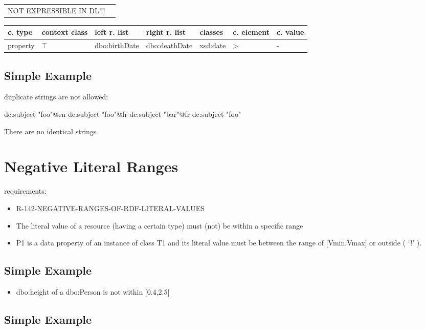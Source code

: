\documentclass{llncs}
\newenvironment{gcotable}{
  \scriptsize
  \sffamily
  \vspace{0.3cm}
	\begin{center}
  \begin{tabular}{l|l|l|l|l|l|l}
  \hline
  \textbf{c. type} & \textbf{context class} & \textbf{left r. list} & \textbf{right r. list} & \textbf{classes} & \textbf{c. element} & \textbf{c. value} \\
  \hline

}{
  \hline
  \end{tabular}
	\end{center}
}
\newenvironment{DL}{
	\begin{center}
  \begin{tabular}{r l}

}{
  \end{tabular}
	\end{center}
}
\begin{document}
\begin{DL}
NOT EXPRESSIBLE IN DL!!!
\end{DL}

\begin{gcotable}
property & $\top$ & dbo:birthDate & dbo:deathDate & xsd:date & \textgreater & - \\
\end{gcotable}

\subsection{Simple Example}

duplicate strings are not allowed:

\begin{ex}
dc:subject "foo"@en
dc:subject "foo"@fr
dc:subject "bar"@fr
dc:subject "foo"
\end{ex}

There are no identical strings.

\section{Negative Literal Ranges}

requirements:

\begin{itemize}
	\item R-142-NEGATIVE-RANGES-OF-RDF-LITERAL-VALUES
\end{itemize}



\begin{itemize}
	\item The literal value of a resource (having a certain type) must (not) be within a specific range
  \item P1 is a data property of an instance of class T1 and its literal value must be between the range of [Vmin,Vmax] or outside ( ‘!' ).
\end{itemize}

\subsection{Simple Example}

\begin{itemize}
	\item dbo:height of a dbo:Person is not within [0.4,2.5]
\end{itemize}

\subsection{Simple Example}
\end{document}
